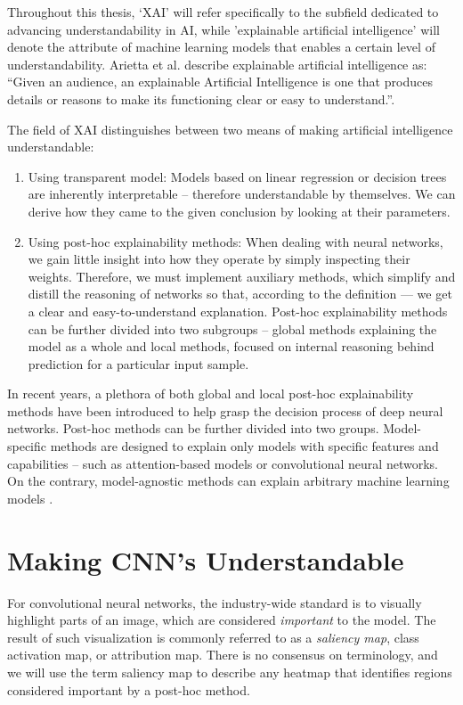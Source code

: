 
Throughout this thesis, `XAI' will refer specifically to the subfield dedicated to advancing understandability in AI, while 'explainable artificial intelligence' will denote the attribute of machine learning models that enables a certain level of understandability. Arietta et al. \cite{arrieta-taxonomy} describe explainable artificial intelligence as: ``Given an audience, an explainable Artificial Intelligence is one that produces details or reasons to make its functioning clear or easy to understand.''.

The field of XAI distinguishes between two means of making artificial intelligence understandable:
\begin{enumerate}
    \item Using transparent model: Models based on linear regression or decision trees are inherently interpretable -- therefore understandable by themselves. We can derive how they came to the given conclusion by looking at their parameters.
    \item Using post-hoc explainability methods: When dealing with neural networks, we gain little insight into how they operate by simply inspecting their weights. Therefore, we must implement auxiliary methods, which simplify and distill the reasoning of networks so that, according to the definition --- we get a clear and easy-to-understand explanation. Post-hoc explainability methods can be further divided into two subgroups -- global methods explaining the model as a whole and local methods, focused on internal reasoning behind prediction for a particular input sample.
\end{enumerate}

In recent years, a plethora of both global and local post-hoc explainability methods have been introduced to help grasp the decision process of deep neural networks. Post-hoc methods can be further divided into two groups. Model-specific methods are designed to explain only models with specific features and capabilities -- such as attention-based models or convolutional neural networks. On the contrary, model-agnostic methods can explain arbitrary machine learning models \cite{arrieta-taxonomy}.

\section{Making CNN's Understandable}

For convolutional neural networks, the industry-wide standard is to visually highlight parts of an image, which are considered \emph{important} to the model. The result of such visualization is commonly referred to as a \emph{saliency map}, class activation map, or attribution map. There is no consensus on terminology, and we will use the term saliency map to describe any heatmap that identifies regions considered important by a post-hoc method. 

